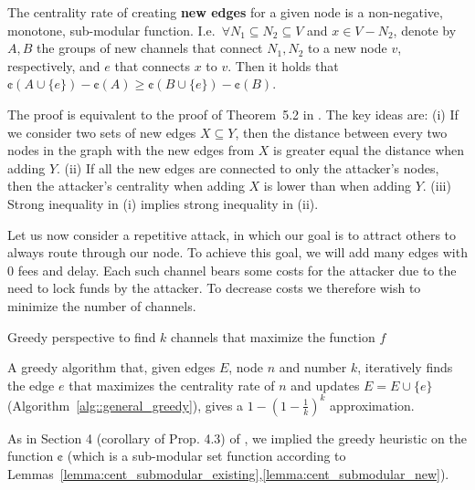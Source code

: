     \begin{lemma}\label{lemma:cent_submodular_new}
        The centrality rate of creating \textbf{new edges} for 
        a given node is a non-negative, monotone, sub-modular function. 
        I.e.~$\forall N_1 \subseteq N_2 \subseteq V$ and $x \in V - N_2$,  denote by $A,B$ the groups of new channels that connect
        $N_1,N_2$ to a new node $v$, respectively, and $e$ that connects $x$ to $v$. 
        Then it holds that $\cent(A \cup \{e\}) - \cent(A) \ge \cent(B \cup \{e\}) - \cent(B)$.
    \end{lemma}
    The proof is equivalent to the proof of Theorem~5.2 in \cite{bergamini2018improving}.
    The key ideas are: (i) If we consider two sets of new edges $X \subseteq Y$, then the distance between every two nodes in the graph with the new edges from $X$ is greater equal 
    the distance when adding $Y$. (ii) If all the new edges are connected to only 
    the attacker's nodes, then the attacker's centrality when adding $X$ is 
    lower than when adding $Y$. (iii) Strong inequality in (i) 
    implies strong inequality in (ii).
    
    Let us now consider a
    repetitive attack, in which our goal is to attract others 
    to always route through our node. To achieve this goal, we will 
    add many edges with 0 fees and delay. Each such channel bears some costs for the attacker due to the need to lock funds by the attacker. To decrease costs we therefore wish to minimize the number of channels. 
    
    \begin{algorithm}
        \DontPrintSemicolon
        
         \caption{Greedy perspective to find $k$ channels that maximize the function $f$}
         \label{alg::general_greedy}
    \end{algorithm}

    \begin{theorem}
        A greedy algorithm that, given edges $E$, node $n$ and number $k$, 
        iteratively finds the edge $e$ that maximizes the centrality rate of $n$ and updates 
        $E = E \cup \{e\}$ (Algorithm~\ref{alg::general_greedy}), 
        gives a $1-(1-\frac{1}{k})^k$ approximation.
    \end{theorem}
    \begin{IEEEproof}
        As in Section 4 (corollary of Prop. 4.3) of \cite{nemhauser1978analysis}, 
        we implied the greedy heuristic on the function $\cent$ (which is a sub-modular 
        set function according to Lemmas~\ref{lemma:cent_submodular_existing},\ref{lemma:cent_submodular_new}).
    \end{IEEEproof}
    
